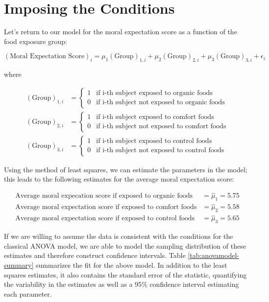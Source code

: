 \documentclass[
]{book}
\theoremstyle{plain}
\theoremstyle{mydefn}
\theoremstyle{myexmpl}
\theoremstyle{remark}
\begin{document}
\hypertarget{imposing-the-conditions-1}{%
\section{Imposing the Conditions}\label{imposing-the-conditions-1}}

Let's return to our model for the moral expectation score as a function of the food exposure group:

\[(\text{Moral Expectation Score})_i = \mu_1 (\text{Group})_{1,i} + \mu_2 (\text{Group})_{2,i} + \mu_3 (\text{Group})_{3,i} + \epsilon_i\]

where

\[
\begin{aligned}
  (\text{Group})_{1,i} &= \begin{cases}
    1 & \text{if i-th subject exposed to organic foods} \\
    0 & \text{if i-th subject not exposed to organic foods} 
    \end{cases} \\
  (\text{Group})_{2,i} &= \begin{cases}
    1 & \text{if i-th subject exposed to comfort foods} \\
    0 & \text{if i-th subject not exposed to comfort foods} 
    \end{cases} \\
  (\text{Group})_{3,i} &= \begin{cases}
    1 & \text{if i-th subject exposed to control foods} \\
    0 & \text{if i-th subject not exposed to control foods}
    \end{cases}
\end{aligned}
\]

Using the method of least squares, we can estimate the parameters in the model; this leads to the following estimates for the average moral expectation score:

\[
\begin{aligned}
  \text{Average moral expecation score if exposed to organic foods} &= \widehat{\mu}_1 = 5.75 \\
  \text{Average moral expectation score if exposed to comfort foods} &= \widehat{\mu}_2 = 5.58 \\
  \text{Average moral expectation score if exposed to control foods} &= \widehat{\mu}_3 = 5.65
\end{aligned}
\]

If we are willing to assume the data is consistent with the conditions for the classical ANOVA model, we are able to model the sampling distribution of these estimates and therefore construct confidence intervals. Table \ref{tab:anovamodel-summary} summarizes the fit for the above model. In addition to the least squares estimates, it also contains the standard error of the statistic, quantifying the variability in the estimates as well as a 95\% confidence interval estimating each parameter.
\end{document}
